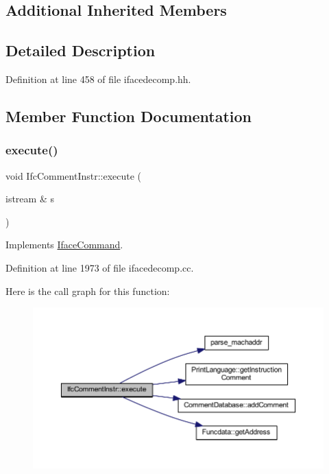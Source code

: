 \subsection*{Additional Inherited Members}


\subsection{Detailed Description}


Definition at line 458 of file ifacedecomp.\+hh.



\subsection{Member Function Documentation}
\mbox{\label{class_ifc_comment_instr_a101c4b13e1dff5bd5fde18c7b62cd38c}} 
\subsubsection{\texorpdfstring{execute()}{execute()}}
{\footnotesize\ttfamily void Ifc\+Comment\+Instr\+::execute (\begin{DoxyParamCaption}\item[{istream \&}]{s }\end{DoxyParamCaption})\hspace{0.3cm}{\ttfamily [virtual]}}



Implements \mbox{\hyperlink{class_iface_command_af10e29cee2c8e419de6efe9e680ad201}{Iface\+Command}}.



Definition at line 1973 of file ifacedecomp.\+cc.

Here is the call graph for this function\+:
\nopagebreak
\begin{figure}[H]
\begin{center}
\leavevmode
\includegraphics[width=350pt]{class_ifc_comment_instr_a101c4b13e1dff5bd5fde18c7b62cd38c_cgraph}
\end{center}
\end{figure}


